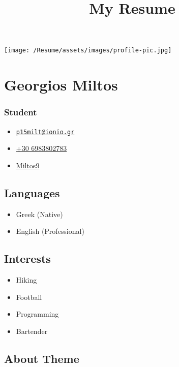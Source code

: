 \documentclass[english,]{article}
\title{My Resume}
\date{}
\providecommand{\tightlist}{%
  \setlength{\itemsep}{0pt}\setlength{\parskip}{0pt}}
\begin{document}
\maketitle

\texttt{[image: /Resume/assets/images/profile-pic.jpg]}

\hypertarget{georgios-miltos}{%
\section{Georgios Miltos}\label{georgios-miltos}}

\hypertarget{student}{%
\subsubsection{Student}\label{student}}

\begin{itemize}
\tightlist
\item
  \emph{} \href{mailto:p15milt@ionio.gr}{\nolinkurl{p15milt@ionio.gr}}
\item
  \emph{} \href{tel:+30\%206983802783}{+30 6983802783}
\item
  \emph{} \href{http://github.com/Miltos9}{Miltos9}
\end{itemize}

\hypertarget{languages}{%
\subsection{Languages}\label{languages}}

\begin{itemize}
\tightlist
\item
  Greek {(Native)}
\item
  English {(Professional)}
\end{itemize}

\hypertarget{interests}{%
\subsection{Interests}\label{interests}}

\begin{itemize}
\tightlist
\item
  Hiking
\item
  Football
\item
  Programming
\item
  Bartender
\end{itemize}

\hypertarget{about-theme}{%
\subsection{About Theme}\label{about-theme}}
\end{document}
